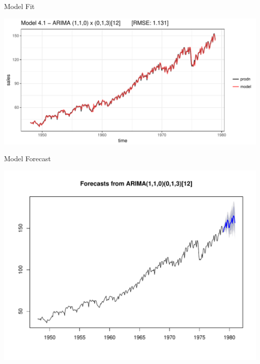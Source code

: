 \documentclass[11pt,ignorenonframetext,]{beamer}
\begin{document}
\begin{frame}{Model Fit}

\includegraphics{Lec11_files/figure-beamer/unnamed-chunk-25-1.pdf}

\end{frame}

\begin{frame}{Model Forecast}

\includegraphics{Lec11_files/figure-beamer/unnamed-chunk-26-1.pdf}

\end{frame}
\end{document}

